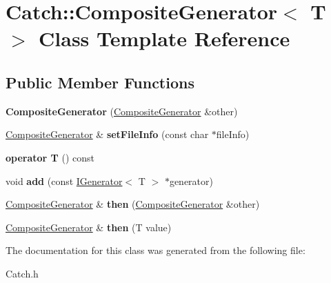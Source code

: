 \hypertarget{class_catch_1_1_composite_generator}{\section{Catch\-:\-:Composite\-Generator$<$ T $>$ Class Template Reference}
\label{class_catch_1_1_composite_generator}
}
\subsection*{Public Member Functions}
\begin{DoxyCompactItemize}
\item 
\hypertarget{class_catch_1_1_composite_generator_a21a7070a00e4a6fe021294c356692692}{{\bfseries Composite\-Generator} (\hyperlink{class_catch_1_1_composite_generator}{Composite\-Generator} \&other)}\label{class_catch_1_1_composite_generator_a21a7070a00e4a6fe021294c356692692}

\item 
\hypertarget{class_catch_1_1_composite_generator_ac3c57cf4ca5472f440bf71e2936bcd4a}{\hyperlink{class_catch_1_1_composite_generator}{Composite\-Generator} \& {\bfseries set\-File\-Info} (const char $\ast$file\-Info)}\label{class_catch_1_1_composite_generator_ac3c57cf4ca5472f440bf71e2936bcd4a}

\item 
\hypertarget{class_catch_1_1_composite_generator_aa3f627d84fb256df0404d19d7fd4b784}{{\bfseries operator T} () const }\label{class_catch_1_1_composite_generator_aa3f627d84fb256df0404d19d7fd4b784}

\item 
\hypertarget{class_catch_1_1_composite_generator_af3774d42ad2d3453d089ca599efe0517}{void {\bfseries add} (const \hyperlink{struct_catch_1_1_i_generator}{I\-Generator}$<$ T $>$ $\ast$generator)}\label{class_catch_1_1_composite_generator_af3774d42ad2d3453d089ca599efe0517}

\item 
\hypertarget{class_catch_1_1_composite_generator_a2e03f42df85cdd238aabd77a80b075d5}{\hyperlink{class_catch_1_1_composite_generator}{Composite\-Generator} \& {\bfseries then} (\hyperlink{class_catch_1_1_composite_generator}{Composite\-Generator} \&other)}\label{class_catch_1_1_composite_generator_a2e03f42df85cdd238aabd77a80b075d5}

\item 
\hypertarget{class_catch_1_1_composite_generator_aefdc11bcfccdf07d2db5f0da3ed8758c}{\hyperlink{class_catch_1_1_composite_generator}{Composite\-Generator} \& {\bfseries then} (T value)}\label{class_catch_1_1_composite_generator_aefdc11bcfccdf07d2db5f0da3ed8758c}

\end{DoxyCompactItemize}


The documentation for this class was generated from the following file\-:\begin{DoxyCompactItemize}
\item 
Catch.\-h\end{DoxyCompactItemize}
